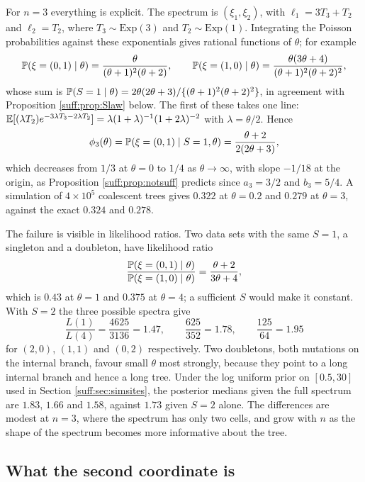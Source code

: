\begin{example}
\label{suff:ex:three}
For $n=3$ everything is explicit. The spectrum is $(\xi_1,\xi_2)$, with $\ell_1=3T_3+T_2$ and
$\ell_2=T_2$, where $T_3\sim\mathrm{Exp}(3)$ and $T_2\sim\mathrm{Exp}(1)$. Integrating the
Poisson probabilities against these exponentials gives rational functions of $\theta$; for
example
\[
\mathbb{P}(\xi=(0,1)\mid\theta)=\frac{\theta}{(\theta+1)^2(\theta+2)},\qquad
\mathbb{P}(\xi=(1,0)\mid\theta)=\frac{\theta(3\theta+4)}{(\theta+1)^2(\theta+2)^2},
\]
whose sum is $\mathbb{P}(S=1\mid\theta)=2\theta(2\theta+3)/\{(\theta+1)^2(\theta+2)^2\}$, in agreement
with Proposition \ref{suff:prop:Slaw} below. The first of these takes one line:
$\mathbb{E}[(\lambda T_2)e^{-3\lambda T_3-2\lambda T_2}]=\lambda(1+\lambda)^{-1}(1+2\lambda)^{-2}$ with
$\lambda=\theta/2$. Hence
\[
\phi_3(\theta)=\mathbb{P}(\xi=(0,1)\mid S=1,\theta)=\frac{\theta+2}{2(2\theta+3)},
\]
which decreases from $1/3$ at $\theta=0$ to $1/4$ as $\theta\to\infty$, with slope $-1/18$ at
the origin, as Proposition \ref{suff:prop:notsuff} predicts since $a_3=3/2$ and $b_3=5/4$. A
simulation of $4\times10^5$ coalescent trees gives $0.322$ at $\theta=0.2$ and $0.279$ at
$\theta=3$, against the exact $0.324$ and $0.278$.

The failure is visible in likelihood ratios. Two data sets with the same $S=1$, a singleton
and a doubleton, have likelihood ratio
\[
\frac{\mathbb{P}(\xi=(0,1)\mid\theta)}{\mathbb{P}(\xi=(1,0)\mid\theta)}=\frac{\theta+2}{3\theta+4},
\]
which is $0.43$ at $\theta=1$ and $0.375$ at $\theta=4$; a sufficient $S$ would make it
constant. With $S=2$ the three possible spectra give
\[
\frac{L(1)}{L(4)}=\frac{4625}{3136}=1.47,\qquad \frac{625}{352}=1.78,\qquad
\frac{125}{64}=1.95
\]
for $(2,0)$, $(1,1)$ and $(0,2)$ respectively. Two doubletons, both mutations on the internal
branch, favour small $\theta$ most strongly, because they point to a long internal branch and
hence a long tree. Under the log uniform prior on $[0.5,30]$ used in Section
\ref{suff:sec:simsites}, the posterior medians given the full spectrum are $1.83$, $1.66$ and
$1.58$, against $1.73$ given $S=2$ alone. The differences are modest at $n=3$, where the
spectrum has only two cells, and grow with $n$ as the shape of the spectrum becomes more
informative about the tree.
\end{example}

\subsection{What the second coordinate is}
\label{suff:sec:secondcoord}

